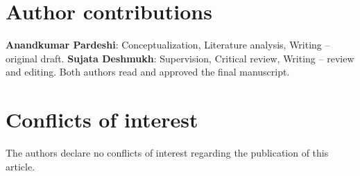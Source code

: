 \documentclass[10pt,a4paper,twocolumn]{article}
\begin{document}
\section*{Author contributions}
{\small \textbf{Anandkumar Pardeshi}: Conceptualization, Literature analysis, Writing -- original draft. \textbf{Sujata Deshmukh}: Supervision, Critical review, Writing -- review and editing. Both authors read and approved the final manuscript.}

\section*{Conflicts of interest}
{\small The authors declare no conflicts of interest regarding the publication of this article.}

\end{document}
